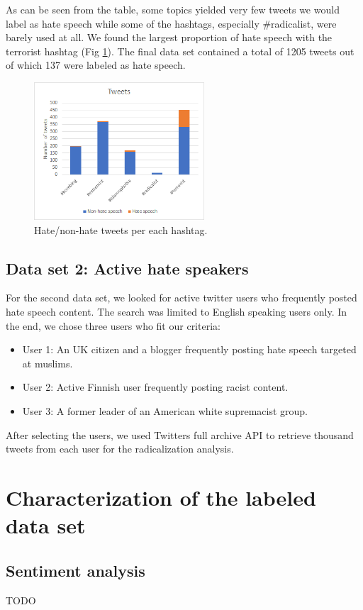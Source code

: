 \documentclass[conference]{IEEEtran}
\begin{document}
As can be seen from the table, some topics yielded very few tweets we would label as hate speech 
while some of the hashtags, especially \#radicalist, were barely used at all. We found the largest
proportion of hate speech with the terrorist hashtag (Fig \ref{fig:data_set_1_summary}). The final 
data set contained a total of 1205 tweets out of which 137 were labeled as hate speech. 

\begin{figure}[htbp]
\centering
\centerline{\includegraphics[width=2.5in]{data_set_1_summary.png}}
\caption{Hate/non-hate tweets per each hashtag.}
\label{fig:data_set_1_summary}
\end{figure}

\subsection{Data set 2: Active hate speakers}
For the second data set, we looked for active twitter users who frequently posted hate speech content. 
The search was limited to English speaking users only. In the end, we chose three users who fit our 
criteria: 
\begin{itemize}
    \item User 1: An UK citizen and a blogger frequently posting hate speech targeted at muslims.
    \item User 2: Active Finnish user frequently posting racist content.
    \item User 3: A former leader of an American white supremacist group.
\end{itemize}
After selecting the users, we used Twitters full archive API to retrieve thousand tweets from each user for the
radicalization analysis. 
\section{Characterization of the labeled data set}
\subsection{Sentiment analysis}
TODO
\end{document}
